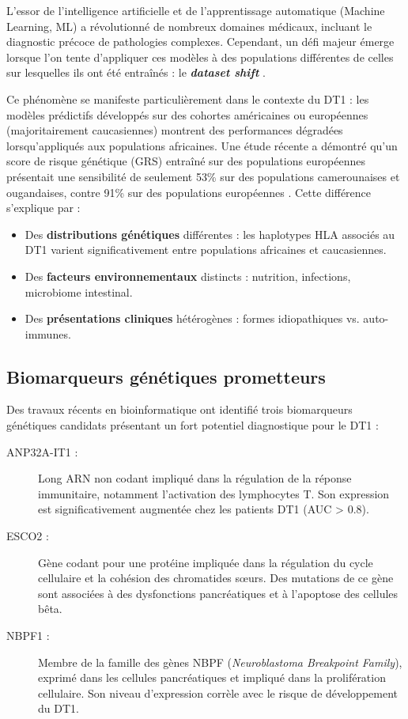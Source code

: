 L'essor de l'intelligence artificielle et de l'apprentissage automatique (Machine Learning, ML) a révolutionné de nombreux domaines médicaux, incluant le diagnostic précoce de pathologies complexes. Cependant, un défi majeur émerge lorsque l'on tente d'appliquer ces modèles à des populations différentes de celles sur lesquelles ils ont été entraînés : le \textbf{\textit{dataset shift}} \cite{Quinonero-Candela2009}.

Ce phénomène se manifeste particulièrement dans le contexte du DT1 : les modèles prédictifs développés sur des cohortes américaines ou européennes (majoritairement caucasiennes) montrent des performances dégradées lorsqu'appliqués aux populations africaines. Une étude récente a démontré qu'un score de risque génétique (GRS) entraîné sur des populations européennes présentait une sensibilité de seulement 53\% sur des populations camerounaises et ougandaises, contre 91\% sur des populations européennes \cite{Oram2025}. Cette différence s'explique par :

\begin{itemize}
    \item Des \textbf{distributions génétiques} différentes : les haplotypes HLA associés au DT1 varient significativement entre populations africaines et caucasiennes.
    \item Des \textbf{facteurs environnementaux} distincts : nutrition, infections, microbiome intestinal.
    \item Des \textbf{présentations cliniques} hétérogènes : formes idiopathiques vs. auto-immunes.
\end{itemize}

\subsection{Biomarqueurs génétiques prometteurs}

Des travaux récents en bioinformatique ont identifié trois biomarqueurs génétiques candidats présentant un fort potentiel diagnostique pour le DT1 \cite{Zhang2022} :

\begin{description}
    \item[ANP32A-IT1 :] Long ARN non codant impliqué dans la régulation de la réponse immunitaire, notamment l'activation des lymphocytes T. Son expression est significativement augmentée chez les patients DT1 (AUC > 0.8).

    \item[ESCO2 :] Gène codant pour une protéine impliquée dans la régulation du cycle cellulaire et la cohésion des chromatides s\oe urs. Des mutations de ce gène sont associées à des dysfonctions pancréatiques et à l'apoptose des cellules bêta.

    \item[NBPF1 :] Membre de la famille des gènes NBPF (\textit{Neuroblastoma Breakpoint Family}), exprimé dans les cellules pancréatiques et impliqué dans la prolifération cellulaire. Son niveau d'expression corrèle avec le risque de développement du DT1.
\end{description}

